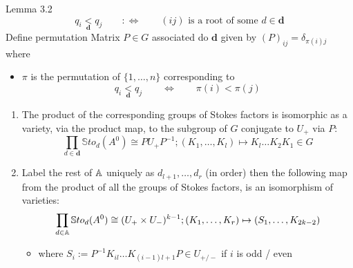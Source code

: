 \begin{frame}{Lemma 3.2}
  \[
    q_i\underset{\textbf{d}}{<}q_j \qquad :\Leftrightarrow
      \qquad (ij) \text{ is a root of some } d\in\textbf{d}
  \]
  Define permutation Matrix $P\in G$ associated do $\textbf{d}$ given by
  $(P)_{ij}=\delta_{\pi(i)j}$ where
  \begin{itemize}
    \item $\pi$ is the permutation of $\{1,\dots,n\}$ corresponding to
    \[
      q_i\underset{\textbf{d}}{<}q_j \qquad \Leftrightarrow \qquad \pi(i)<\pi(j)
    \]
  \end{itemize}
  \begin{lem}
    \begin{enumerate}
      \item The product of the corresponding groups of Stokes factors is
      isomorphic as a variety, via the product map, to the subgroup of $G$
      conjugate to $U_+$ via $P$:
      \[
      \prod_{d\in\textbf{d}}\mathbb{S}to_d(A^0)\cong PU_+P^{-1} ;
      (K_1,\dots,K_l)\mapsto K_l\dots K_2K_1\in G
      \]
      \item Label the rest of $\mathbb{A}$ uniquely as $d_{l+1},\dots,d_r$ (in order)
      then the following map from the product of all the groups of Stokes
      factors, is an isomorphism of varieties:
      \[
      \prod_{d\in\mathbb{A}}\mathbb{S}to_d(A^0)\cong (U_+\times U_-)^{k-1} ;
      (K_1,\dots,K_r)\mapsto (S_1,\dots,K_{2k-2})
      \]
      \begin{itemize}
        \item where $S_i:=P^{-1}K_{il}\dots K_{(i-1)l+1}P\in U_{+/-}$ if $i$ is
        odd / even
      \end{itemize}
    \end{enumerate}
  \end{lem}
\end{frame}

